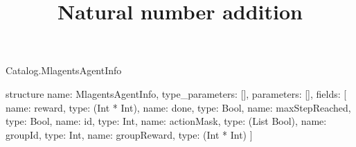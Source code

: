 \begin{lexlean}{Catalog.MlagentsAgentInfo}
\title{Natural number addition}
\begin{semanticmodule}
structure{
  name: MlagentsAgentInfo,
  type_parameters: [],
  parameters: [],
  fields: [
    {name: reward, type: (Int * Int)},
    {name: done, type: Bool},
    {name: maxStepReached, type: Bool},
    {name: id, type: Int},
    {name: actionMask, type: (List Bool)},
    {name: groupId, type: Int},
    {name: groupReward, type: (Int * Int)}
  ]
}
\end{semanticmodule}
\end{lexlean}
